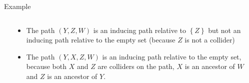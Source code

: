 \documentclass[english, compress, red]{beamer}
\begin{document}
\begin{frame}{Example}
	\begin{columns}
			\begin{column}{0.3\textwidth}
			\centering
		\end{column}
		\begin{column}{0.7\textwidth}
			\begin{itemize}
				\item The path $(Y,Z,W)$ is an inducing path relative to $\left\{ Z\right\}$ but not an inducing path relative to the empty set (because $Z$ is not a collider)
				\item The path $(Y,X,Z,W)$ is an inducing path relative to the empty set, because both $X$ and $Z$ are colliders on the path, $X$ is an ancestor of $W$ and $Z$ is an ancestor of $Y$.
			\end{itemize}
		\end{column}
	\end{columns}
\end{frame}
\end{document}
